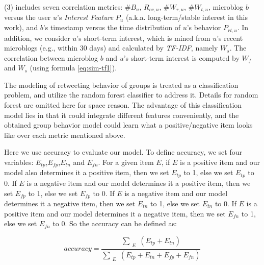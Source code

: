 	\stab(3)  includes seven correlation metrics: \#$B_u$, $R_{oc,u}$, \#$W_{r,u}$, \#$W_{t,u}$, microblog $b$ versus the user $u$'s \textit{Interest Feature} $P_u$ (a.k.a. long-term/stable interest in this work), and $b$'s timestamp versus the time distribution of $u$'s \retg{} behavior $P_{rt,u}$.
In addition, we consider $u$'s short-term interest, which is mined from $u$'s recent microblogs (e.g., within 30 days) and calculated by \textit{TF-IDF}, namely $W_s$.
The correlation between microblog $b$ and $u$'s short-term interest is computed by $W_f$ and $W_s$ (using formula \ref{eq:sim-tf1}).

The modeling of retweeting behavior of groups is treated as a classification problem, and utilize the random forest classifier to address it. Details for random forest \cite{IEEEexample:conf/icdar/Ho1995} are omitted here for space reason.
The advantage of this classification model lies in that it could integrate different features conveniently, and
the obtained group behavior model could learn what a positive/negative item looks like over each metric mentioned above. \par
Here we use accuracy to evaluate our model. To define accuracy, we set four variables: $E_{tp}$,$E_{fp}$,$E_{tn}$ and $E_{fn}$. For a given item $E$, if $E$ is a positive item and our model also determines it a positive item, then we set $E_{tp}$ to 1, else we set $E_{tp}$ to 0. If $E$ is a negative item and our model determines it a positive item, then we set $E_{fp}$ to 1, else we set $E_{fp}$ to 0. If $E$ is a negative item and our model determines it a negative item, then we set $E_{tn}$ to 1, else we set $E_{tn}$ to 0. If $E$ is a positive item and our model determines it a negative item, then we set $E_{fn}$ to 1, else we set $E_{fn}$ to 0. So the accuracy can be defined as:

\begin{equation}
\label{eq:def-precision1}
accuracy = \frac{\sum_{\substack{E}} (E_{tp} + E_{tn} )}{ \sum_{\substack{E}} (E_{tp} + E_{tn} + E_{fp} + E_{fn}) }
\end{equation}


















